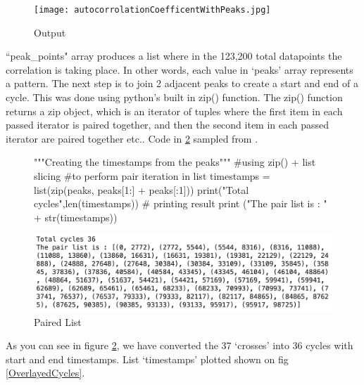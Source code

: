 \begin{figure}[ht]

\texttt{[image: autocorrolationCoefficentWithPeaks.jpg]}
\caption{Output}
\label{autocorrolaiton with peaks}
\end{figure}

``peak\_points" array produces a list where in the 123,200 total datapoints the correlation is taking place. In other words, each value in ‘peaks’ array represents a pattern. The next step is to join 2 adjacent peaks to create a start and end of a cycle. This was done using python's built in zip() function. The zip() function returns a zip object, which is an iterator of tuples where the first item in each passed iterator is paired together, and then the second item in each passed iterator are paired together etc.\cite{defZip}. Code in \ref{Paired List} sampled from \cite{paiedList}.

\begin{figure}[ht]
\centering

\begin{python}
"""Creating the timestamps from the peaks""" 
#using zip() + list slicing 
#to perform pair iteration in list
timestamps = list(zip(peaks, peaks[1:] + peaks[:1]))
print("Total cycles",len(timestamps))
# printing result
print ("The pair list is : " + str(timestamps))
\end{python}

\includegraphics[scale=0.5]{images/arrayPeaks.png}
\caption{Paired List}
\label{Paired List}
\end{figure}

As you can see in figure \ref{Paired List}, we have converted the 37 
`crosses' into 36 cycles with start and end timestamps. List `timestamps' plotted shown on fig \ref{OverlayedCycles}.


